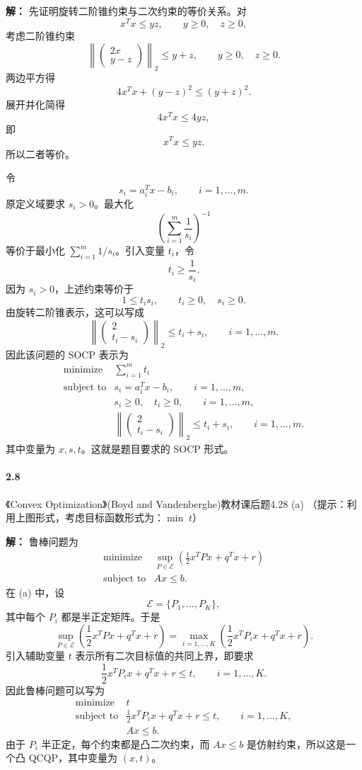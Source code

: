 \documentclass[12pt,a4paper]{article}
\begin{document}
\textbf{解：}
先证明旋转二阶锥约束与二次约束的等价关系。对
\[
  x^Tx\leq yz,\qquad y\geq 0,\quad z\geq 0,
\]
考虑二阶锥约束
\[
  \left\|
  \begin{pmatrix}
    2x\\ y-z
  \end{pmatrix}
  \right\|_2\leq y+z,\qquad y\geq 0,\quad z\geq 0.
\]
两边平方得
\[
  4x^Tx+(y-z)^2\leq (y+z)^2.
\]
展开并化简得
\[
  4x^Tx\leq 4yz,
\]
即
\[
  x^Tx\leq yz.
\]
所以二者等价。

令
\[
  s_i=a_i^Tx-b_i,\qquad i=1,\ldots,m.
\]
原定义域要求 $s_i>0$。最大化
\[
  \left(\sum_{i=1}^m\frac{1}{s_i}\right)^{-1}
\]
等价于最小化 $\sum_{i=1}^m 1/s_i$。引入变量 $t_i$，令
\[
  t_i\geq \frac{1}{s_i}.
\]
因为 $s_i>0$，上述约束等价于
\[
  1\leq t_i s_i,\qquad t_i\geq 0,\quad s_i\geq 0.
\]
由旋转二阶锥表示，这可以写成
\[
  \left\|
  \begin{pmatrix}
    2\\ t_i-s_i
  \end{pmatrix}
  \right\|_2\leq t_i+s_i,\qquad i=1,\ldots,m.
\]
因此该问题的 SOCP 表示为
\[
\begin{array}{ll}
  \text{minimize} & \displaystyle \sum_{i=1}^m t_i\\[0.5em]
  \text{subject to} & s_i=a_i^Tx-b_i,\qquad i=1,\ldots,m,\\
  & s_i\geq 0,\quad t_i\geq 0,\qquad i=1,\ldots,m,\\
  & \left\|
    \begin{pmatrix}
      2\\ t_i-s_i
    \end{pmatrix}
    \right\|_2\leq t_i+s_i,\qquad i=1,\ldots,m.
\end{array}
\]
其中变量为 $x,s,t$。这就是题目要求的 SOCP 形式。


\paragraph{2.8} 《Convex Optimization》(Boyd and Vandenberghe)教材课后题4.28 (a) （提示：利用上图形式，考虑目标函数形式为：$\min \; t$）

\textbf{解：}
鲁棒问题为
\[
\begin{array}{ll}
  \text{minimize} & \displaystyle \sup_{P\in\mathcal E}
  \left(\frac12x^TPx+q^Tx+r\right)\\[0.3em]
  \text{subject to} & Ax\leq b.
\end{array}
\]
在 (a) 中，设
\[
  \mathcal E=\{P_1,\ldots,P_K\},
\]
其中每个 $P_i$ 都是半正定矩阵。于是
\[
  \sup_{P\in\mathcal E}
  \left(\frac12x^TPx+q^Tx+r\right)
  =
  \max_{i=1,\ldots,K}
  \left(\frac12x^TP_ix+q^Tx+r\right).
\]
引入辅助变量 $t$ 表示所有二次目标值的共同上界，即要求
\[
  \frac12x^TP_ix+q^Tx+r\leq t,\qquad i=1,\ldots,K.
\]
因此鲁棒问题可以写为
\[
\begin{array}{ll}
  \text{minimize} & t\\[0.3em]
  \text{subject to} &
  \displaystyle \frac12x^TP_ix+q^Tx+r\leq t,\qquad i=1,\ldots,K,\\
  & Ax\leq b.
\end{array}
\]
由于 $P_i$ 半正定，每个约束都是凸二次约束，而 $Ax\leq b$ 是仿射约束，所以这是一个凸 QCQP，其中变量为 $(x,t)$。
\end{document}
